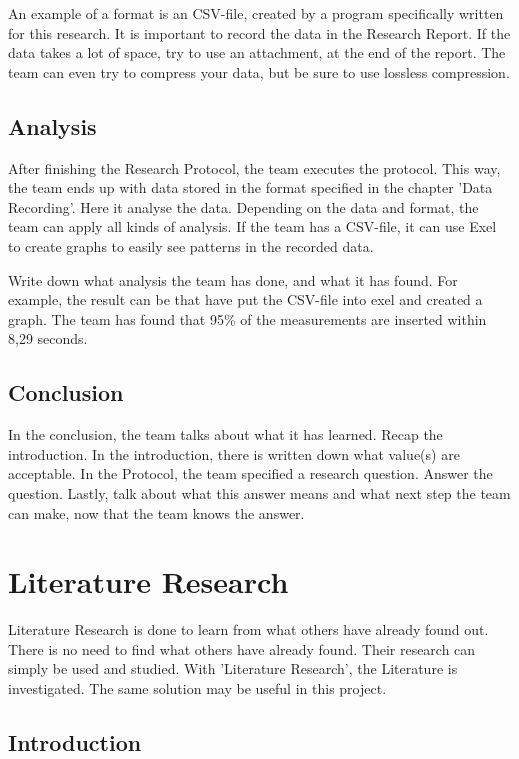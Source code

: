 \documentclass[10pt]{report}
\begin{document}
An example of a format is an CSV-file, created by a program specifically written for this research. It is important to record the data in the Research Report. If the data takes a lot of space, try to use an attachment, at the end of the report. The team can even try to compress your data, but be sure to use lossless compression.

\subsection{Analysis}

After finishing the Research Protocol, the team executes the protocol. This way, the team ends up with data stored in the format specified in the chapter 'Data Recording'. Here it analyse the data. Depending on the data and format, the team can apply all kinds of analysis. If the team has a CSV-file, it can use Exel to create graphs to easily see patterns in the recorded data.

Write down what analysis the team has done, and what it has found. For example, the result can be that have put the CSV-file into exel and created a graph. The team has found that 95\% of the measurements are inserted within 8,29 seconds.

\subsection{Conclusion}

In the conclusion, the team talks about what it has learned. Recap the introduction. In the introduction, there is written down what value(s) are acceptable. In the Protocol, the team specified a research question. Answer the question. Lastly, talk about what this answer means and what next step the team can make, now that the team knows the answer.

\newpage

\section{Literature Research}

Literature Research is done to learn from what others have already found out. There is no need to find what others have already found. Their research can simply be used and studied. With 'Literature Research', the Literature is investigated. The same solution may be useful in this project.

\subsection{Introduction}
\end{document}

